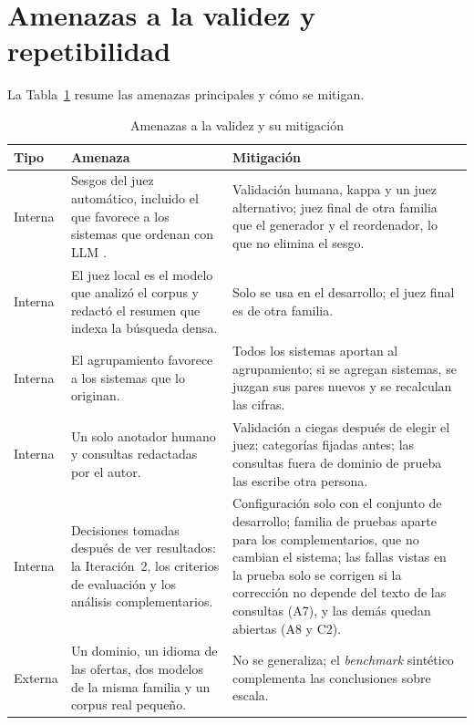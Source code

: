 \section{Amenazas a la validez y repetibilidad}
\label{sec:met-validez}
\label{sec:met-reproducibilidad}

La Tabla~\ref{tab:met-validez} resume las amenazas principales y cómo se mitigan.

\begin{table}[!htb]
    \centering
    \caption{Amenazas a la validez y su mitigación}
    \label{tab:met-validez}
    \footnotesize
    \begin{tabular}{|p{2cm}|p{6.3cm}|p{5.9cm}|}
        \hline
        \textbf{Tipo} & \textbf{Amenaza} & \textbf{Mitigación} \\
        \hline
        Interna & Sesgos del juez automático, incluido el que favorece a los sistemas que ordenan con LLM \citep{Frobe2025}. & Validación humana, kappa y un juez alternativo; juez final de otra familia que el generador y el reordenador, lo que no elimina el sesgo. \\
        \hline
        Interna & El juez local es el modelo que analizó el corpus y redactó el resumen que indexa la búsqueda densa. & Solo se usa en el desarrollo; el juez final es de otra familia. \\
        \hline
        Interna & El agrupamiento favorece a los sistemas que lo originan. & Todos los sistemas aportan al agrupamiento; si se agregan sistemas, se juzgan sus pares nuevos y se recalculan las cifras. \\
        \hline
        Interna & Un solo anotador humano y consultas redactadas por el autor. & Validación a ciegas después de elegir el juez; categorías fijadas antes; las consultas fuera de dominio de prueba las escribe otra persona. \\
        \hline
        Interna & Decisiones tomadas después de ver resultados: la Iteración~2, los criterios de evaluación y los análisis complementarios. & Configuración solo con el conjunto de desarrollo; familia de pruebas aparte para los complementarios, que no cambian el sistema; las fallas vistas en la prueba solo se corrigen si la corrección no depende del texto de las consultas (A7), y las demás quedan abiertas (A8 y C2). \\
        \hline
        Externa & Un dominio, un idioma de las ofertas, dos modelos de la misma familia y un corpus real pequeño. & No se generaliza; el \textit{benchmark} sintético complementa las conclusiones sobre escala. \\

\end{tabular}
\end{table}
